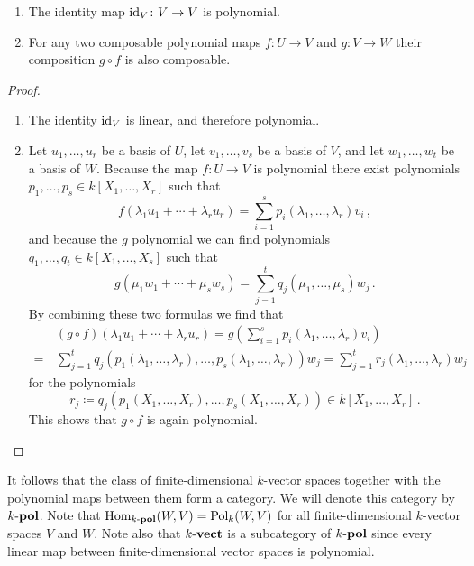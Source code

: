 \begin{lemma}
  \leavevmode
  \begin{enumerate}
    \item
      The identity map $\operatorname{id}_V \colon V \to V$ is polynomial.
    \item
      For any two composable polynomial maps $f \colon U \to V$ and $g \colon V \to W$ their composition $g \circ f$ is also composable.
  \end{enumerate}
\end{lemma}
\begin{proof}
  \leavevmode
  \begin{enumerate}
    \item
      The identity $\operatorname{id}_V$ is linear, and therefore polynomial.
    \item
      Let $u_1, \dotsc, u_r$ be a basis of $U$, let $v_1, \dotsc, v_s$ be a basis of $V$, and let $w_1, \dotsc, w_t$ be a basis of $W$.
      Because the map $f \colon U \to V$ is polynomial there exist polynomials $p_1, \dotsc, p_s \in k[X_1, \dotsc, X_r]$ such that
      \[
          f( \lambda_1 u_1 + \dotsb + \lambda_r u_r )
        = \sum_{i=1}^s p_i(\lambda_1, \dotsc, \lambda_r) v_i \,,
      \]
      and because  the $g$ polynomial we can find polynomials $q_1, \dotsc, q_t \in k[X_1, \dotsc, X_s]$ such that
      \[
          g( \mu_1 w_1 + \dotsb + \mu_s w_s )
        = \sum_{j=1}^t q_j(\mu_1, \dotsc, \mu_s) w_j \,.
      \]
      By combining these two formulas we find that
      \begin{align*}
         &\,  (g \circ f)( \lambda_1 u_1 + \dotsb + \lambda_r u_r)
        =     g
              \left(
                \sum_{i=1}^s p_i(\lambda_1, \dotsc, \lambda_r) v_i
              \right) \\
        =&\,  \sum_{j=1}^t
              q_j
              (
              p_1(\lambda_1, \dotsc, \lambda_r),
              \dotsc,
              p_s(\lambda_1, \dotsc, \lambda_r)
              )
              w_j
        =  \sum_{j=1}^t r_j(\lambda_1, \dotsc, \lambda_r) w_j
      \end{align*}
      for the polynomials
      \[
                  r_j
        \coloneqq q_j(p_1(X_1, \dotsc, X_r), \dotsc, p_s(X_1, \dotsc, X_r))
        \in       k[X_1, \dotsc, X_r] \,.
      \]
      This shows that $g \circ f$ is again polynomial.
  \qedhere
  \end{enumerate}
\end{proof}


\begin{remark}
  It follows that the class of finite-dimensional $k$-vector spaces together with the polynomial maps between them form a category.
  We will denote this category by $k\text{-}\mathbf{pol}$.
  Note that $\operatorname{Hom}_{k\text{-}\mathbf{pol}}(W,V) = \operatorname{Pol}_k(W,V)$ for all finite-dimensional $k$-vector spaces $V$ and $W$.
  Note also that $k\text{-}\mathbf{vect}$ is a subcategory of $k\text{-}\mathbf{pol}$ since every linear map between finite-dimensional vector spaces is polynomial.
\end{remark}


